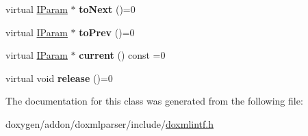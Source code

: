 \begin{DoxyCompactItemize}
virtual \mbox{\hyperlink{class_i_param}{I\+Param}} $\ast$ {\bfseries to\+Next} ()=0
\item 
\mbox{\label{class_i_param_iterator_a78fe90dc8543b093e41d87e13a0ac594}} 
virtual \mbox{\hyperlink{class_i_param}{I\+Param}} $\ast$ {\bfseries to\+Prev} ()=0
\item 
\mbox{\label{class_i_param_iterator_a256bcb479f1c84538fbd15b1ef55d1e7}} 
virtual \mbox{\hyperlink{class_i_param}{I\+Param}} $\ast$ {\bfseries current} () const =0
\item 
\mbox{\label{class_i_param_iterator_a3a68af5122ed250f957922e219329ad1}} 
virtual void {\bfseries release} ()=0
\end{DoxyCompactItemize}


The documentation for this class was generated from the following file\+:\begin{DoxyCompactItemize}
\item 
doxygen/addon/doxmlparser/include/\mbox{\hyperlink{include_2doxmlintf_8h}{doxmlintf.\+h}}\end{DoxyCompactItemize}

